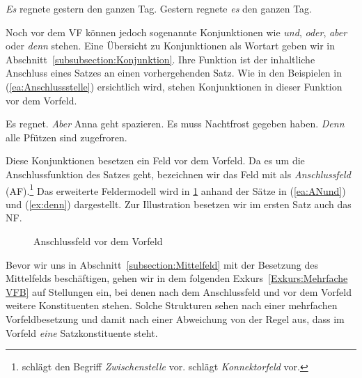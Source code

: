 \ea \label{ea:form_Subjekt}
\ea \label{ea:es_regnete} \textit{Es} regnete gestern den ganzen Tag.
\ex \label{ex:regnete_es} Gestern regnete \textit{es} den ganzen Tag.
\z 
\z 

Noch vor dem VF können jedoch sogenannte Konjunktionen wie \textit{und}, \textit{oder}, \textit{aber} oder \textit{denn} stehen. Eine Übersicht zu Konjunktionen als Wortart geben wir in Abschnitt~\ref{subsubsection:Konjunktion}. Ihre Funktion ist der inhaltliche Anschluss eines Satzes an einen vorhergehenden Satz. Wie in den Beispielen in (\ref{ea:Anschlussstelle}) ersichtlich wird, stehen Konjunktionen in dieser Funktion vor dem Vorfeld.  

\ea \label{ea:Anschlussstelle}
\ea \label{ea:ANund} Es regnet. \textit{Aber} Anna geht spazieren.
\ex \label{ex:denn} Es muss Nachtfrost gegeben haben. \textit{Denn} alle Pfützen sind zugefroren.
\z 
\z 

Diese Konjunktionen besetzen ein Feld vor dem Vorfeld. Da es um die Anschlussfunktion des Satzes geht, bezeichnen wir das Feld mit \citet[65]{Woellstein2014} als \textit{Anschlussfeld} (AF).\footnote{\citet[80]{Agel2017} schlägt den Begriff \textit{Zwischenstelle} vor. \citet[398]{Schaefer2018_3Aufl} schlägt \textit{Konnektorfeld} vor.} Das erweiterte Feldermodell wird in \ref{fig:FeldermodelmitAF} anhand der Sätze in (\ref{ea:ANund}) und (\ref{ex:denn}) dargestellt. Zur Illustration besetzen wir im ersten Satz auch das NF. 

\begin{figure}[!htbp]
  \centering
  \caption{Anschlussfeld vor dem Vorfeld}
  \label{fig:FeldermodelmitAF}
\end{figure}

Bevor wir uns in Abschnitt~\ref{subsection:Mittelfeld} mit der Besetzung des Mittelfelds beschäftigen, gehen wir in dem folgenden Exkurs~\ref{Exkurs:Mehrfache VFB} auf Stellungen ein, bei denen nach dem Anschlussfeld und vor dem Vorfeld weitere Konstituenten stehen. Solche Strukturen sehen nach einer mehrfachen Vorfeldbesetzung und damit nach einer Abweichung von der Regel aus, dass im Vorfeld \textit{eine} Satzkonstituente steht.



